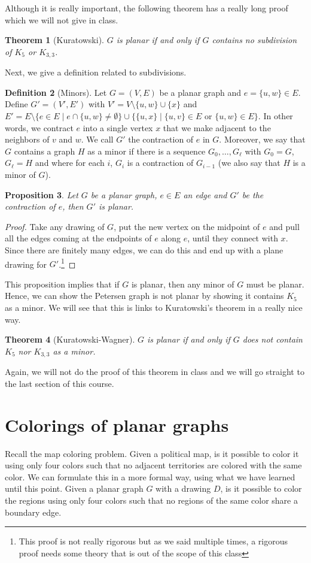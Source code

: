 \documentclass{tufte-handout}
\newtheorem{thm}{Theorem}
\newtheorem{prop}[thm]{Proposition}
\theoremstyle{definition}
\newtheorem{defn}[thm]{Definition}
\theoremstyle{remark}
\begin{document}
Although it is really important, the following theorem has a really long proof which we will not give in class.
\begin{thm}[Kuratowski]
	$G$ is planar if and only if $G$ contains no subdivision of $K_5$ or $K_{3,3}$.
\end{thm}
Next, we give a definition related to subdivisions.
\begin{defn}[Minors]
	Let $G = (V,E)$ be a planar graph and $e = \{u,w\}\in E$. Define $G' = (V', E') $ with $V' = V \setminus \{u,w\} \cup \{x\}$ and $E' = E \setminus \{e \in E \mid e \cap \{u,w\} \neq \emptyset\} \cup \{\{u,x\} \mid \{u,v\} \in E \mbox{ or } \{u,w\} \in E\}$. In other words, we contract $e$ into a single vertex $x$ that we make adjacent to the neighbors of $v$ and $w$. We call $G'$ the contraction of $e$ in $G$. Moreover, we say that $G$ contains a graph $H$ as a minor if there is a sequence $G_0, \dots, G_{\ell}$ with $G_0 = G$, $G_{\ell} = H$ and where for each $i$, $G_i$ is a contraction of $G_{i-1}$ (we also say that $H$ is a minor of $G$).
\end{defn}
\begin{prop}
	Let $G$ be a planar graph, $e \in E$ an edge and $G'$ be the contraction of $e$, then $G'$ is planar.
\end{prop}
\begin{proof}
	Take any drawing of $G$, put the new vertex on the midpoint of $e$ and pull all the edges coming at the endpoints of $e$ along $e$, until they connect with $x$. Since there are finitely many edges, we can do this and end up with a plane drawing for $G'$.\footnote{This proof is not really rigorous but as we said multiple times, a rigorous proof needs some theory that is out of the scope of this class}
\end{proof}
This proposition implies that if $G$ is planar, then any minor of $G$ must be planar. Hence, we can show the Petersen graph is not planar by showing it contains $K_5$ as a minor. We will see that this is links to Kuratowski's theorem in a really nice way.
\begin{thm}[Kuratowski-Wagner]
	$G$ is planar if and only if $G$ does not contain $K_5$ nor $K_{3,3}$ as a minor.
\end{thm}
Again, we will not do the proof of this theorem in class and we will go straight to the last section of this course.

\section{Colorings of planar graphs}
Recall the map coloring problem. Given a political map, is it possible to color it using only four colors such that no adjacent territories are colored with the same color. We can formulate this in a more formal way, using what we have learned until this point. Given a planar graph $G$ with a drawing $D$, is it possible to color the regions using only four colors such that no regions of the same color share a boundary edge.
\end{document}
